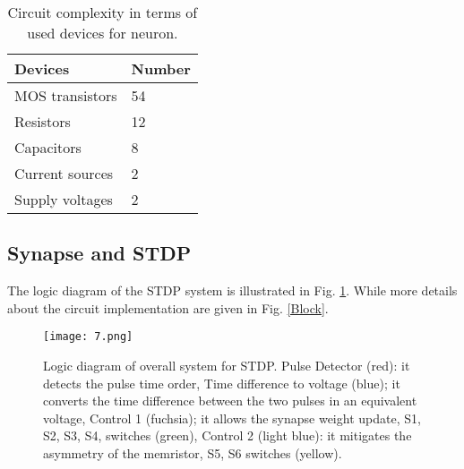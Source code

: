 \documentclass[review]{elsarticle}
\begin{document}
\begin{table}[]
\centering
\caption{Circuit complexity in terms of used devices for neuron.}
\label{table:res}
\begin{tabular}{|l|l|}
 \hline
  Devices&  Number\\
 \hline
 MOS transistors& 54   \\
Resistors & 12  \\
 Capacitors& 8   \\
Current sources & 2 \\
 Supply voltages& 2 \\
 \hline
 \end{tabular}
\end{table}

\subsection{Synapse and STDP}
\label{sy_s} 
The logic diagram of the STDP system is illustrated in Fig. \ref{STDPlg}. While more details about the circuit implementation are given in Fig. \ref{Block}. 
\begin{figure}[!htbp]
\centering
\texttt{[image: 7.png]}
\caption{ Logic diagram of overall system for STDP. Pulse Detector (red): it detects the pulse time order, Time difference to voltage (blue); it converts the time difference between the two pulses in an equivalent voltage, Control 1 (fuchsia); it allows the synapse weight update, S1, S2, S3, S4, switches (green), Control 2 (light blue): it mitigates the asymmetry of the memristor, S5, S6 switches (yellow).}
\label{STDPlg}
\end{figure}
\end{document}
